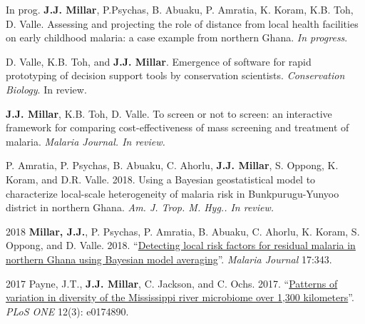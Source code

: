 

\begin{cvskills}

  \cvskill
    {In prog.} %
    {\textbf{J.J. Millar}, P.Psychas, B. Abuaku, P. Amratia, K. Koram, K.B. Toh, D. Valle. Assessing and projecting the role of distance from local health facilities on early childhood malaria: a case example from northern Ghana. \textit{In progress}.} %
    
\cvskill
    {} %
    {D. Valle, K.B. Toh, and \textbf{J.J. Millar}. Emergence of software for rapid prototyping of decision support tools by conservation scientists. \textit{Conservation Biology}. In review.} %
    
\cvskill
    {} %
    {\textbf{J.J. Millar}, K.B. Toh, D. Valle. To screen or not to screen: an interactive framework for comparing cost-effectiveness of mass screening and treatment of malaria. \textit{Malaria Journal. In review.}} %
    
\cvskill
    {} %
    {P. Amratia, P. Psychas, B. Abuaku, C. Ahorlu, \textbf{J.J. Millar}, S. Oppong, K. Koram, and D.R. Valle. 2018. Using a Bayesian geostatistical model to characterize local-scale heterogeneity of malaria risk in Bunkpurugu-Yunyoo district in northern Ghana. \textit{Am. J. Trop. M. Hyg.. In review.}
} %

  \cvskill
    {2018} %
    {\textbf{Millar, J.J.}, P. Psychas, P. Amratia, B. Abuaku, C. Ahorlu, K. Koram, S. Oppong, and D. Valle. 2018. “\href{https://malariajournal.biomedcentral.com/articles/10.1186/s12936-018-2491-2}{Detecting local risk factors for residual malaria in northern Ghana using Bayesian model averaging}”. \textit{Malaria Journal} 17:343.} 

\cvskill
    {2017} %
    {Payne, J.T., \textbf{J.J. Millar}, C. Jackson, and C. Ochs. 2017. “\href{http://journals.plos.org/plosone/article?id=10.1371/journal.pone.0174890}{Patterns of variation in diversity of the Mississippi river microbiome over 1,300 kilometers}”. \textit{PLoS ONE} 12(3): e0174890.} 


\end{cvskills}
